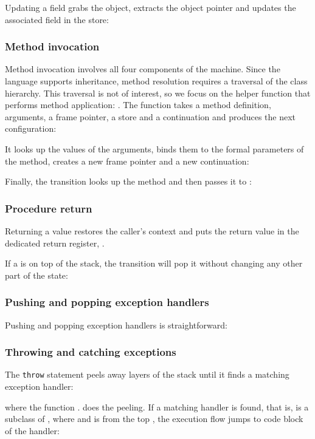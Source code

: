 Updating a field grabs the object, extracts the object pointer
and updates the associated field in the store:



\subsubsection{Method invocation}

Method invocation involves all four components of the
machine.
Since the language supports inheritance, method resolution requires a traversal
of the class hierarchy.  This traversal
is not of interest, so we focus on the
helper function that performs method application:
. The function  takes a method definition,
arguments,
a frame pointer,
a store and a continuation and produces the next configuration:

It looks up the values of the arguments, binds them to the formal parameters of the method, creates a new frame pointer and  a new continuation:

Finally, the transition looks up the method
 and then passes it to :


\subsubsection{Procedure return}
Returning a value restores the caller's context and puts the return value in
the dedicated return register,  .

If a  is on top of the stack, 
the transition will pop it
without changing any other part of the state:
 
  

\subsubsection{Pushing and popping exception handlers} 
Pushing and popping exception handlers is straightforward:

 


\subsubsection{Throwing and catching exceptions}
The {\tt{throw}} statement peels away layers of the stack until it finds a matching exception handler:

where the function 
.
does the peeling.
If  a matching handler is found, that is,  is a subclass of  ,
where  
and  is from the top ,
the execution flow jumps to code block of the handler:

